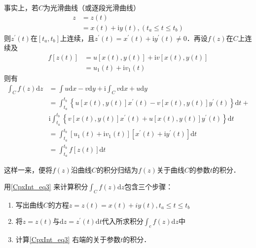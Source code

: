 事实上，若$C$为光滑曲线（或逐段光滑曲线）
\begin{equation}
\begin{aligned} z &=z(t) \\ &=x(t)+\mathrm{i} y(t),(t_a \leqslant t \leqslant t_b) \end{aligned}
\end{equation}
则$z^\prime(t)$在$[t_a, t_b]$上连续，且$z^\prime(t) = x^\prime(t) + \mathrm iy^\prime(t) \neq  0$．再设$ f (z)$在$C$上连续及
\begin{equation}
\begin{aligned} f[z(t)] &=u[x(t), y(t)]+\mathrm{i} v[x(t), y(t)] \\ &=u_{1}(t)+\mathrm{i} v_{1}(t) \end{aligned}
\end{equation}
则有
\begin{equation} \label{CpxInt_eq3}
\begin{aligned} \int_{C} f(z) \mathrm{d} z &=\int u \mathrm{d} x-v \mathrm{d} y+\mathrm{i} \int_{C} v \mathrm{d} x+u \mathrm{d} y \\ &=\int_{t_a}^{t_b}\left\{u[x(t), y(t)] x^{\prime}(t)-v[x(t), y(t)] y^{\prime}(t)\right\} \mathrm{d} t+\\ & \mathrm{i} \int_{t_a}^{t_b}\left\{v[x(t), y(t)] x^{\prime}(t)+u[x(t), y(t)] y^{\prime}(t)\right\} \mathrm{d} t \\ &=\int_{t_a}^{t_b}\left[u_{1}(t)+\mathrm{i} v_{1}(t)\right]\left[x^{\prime}(t)+\mathrm{i} y^{\prime}(t)\right] \mathrm{d} t \\ &=\int_{t_a}^{t_b} f[z(t)] \mathrm{d} t \end{aligned}
\end{equation}

这样一来，便将$ f (z)$沿曲线$C$的积分归结为$ f (z)$关于曲线$C$的参数$t$的积分．

用\autoref{CpxInt_eq3} 来计算积分$\displaystyle \int_{C} f(z) \mathrm{d} z$包含三个步骤：
\begin{enumerate}
\item 写出曲线$C$的方程$z=z(t)=x(t)+i y(t), t_a \leqslant t \leqslant t_b$
\item 将$ z = z(t)$与$\mathrm{d}z = z^\prime (t)\mathrm{d}t $代入所求积分$\displaystyle \int_{c} f(z) \mathrm{d} z$中
\item 计算\autoref{CpxInt_eq3} 右端的关于参数$t$的积分．
\end{enumerate}

